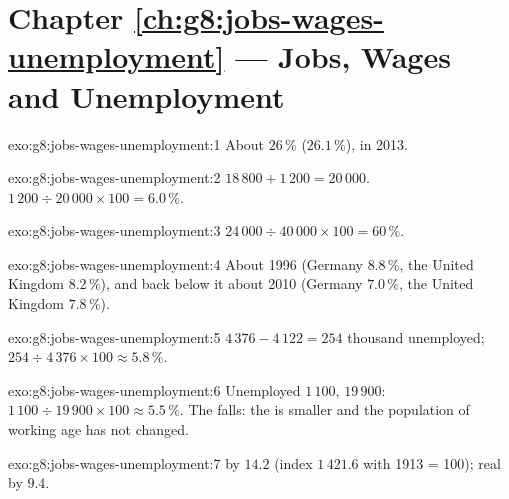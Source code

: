 \section*{Chapter \ref{ch:g8:jobs-wages-unemployment} --- Jobs, Wages and Unemployment}

\begin{solution}{exo:g8:jobs-wages-unemployment:1}
About $26\,\%$ ($26.1\,\%$), in 2013.
\end{solution}

\begin{solution}{exo:g8:jobs-wages-unemployment:2}
 $18\,800 + 1\,200 = 20\,000$.  $1\,200 \div 20\,000 \times 100 = 6.0\,\%$.
\end{solution}

\begin{solution}{exo:g8:jobs-wages-unemployment:3}
$24\,000 \div 40\,000 \times 100 = 60\,\%$.
\end{solution}

\begin{solution}{exo:g8:jobs-wages-unemployment:4}
About 1996 (Germany $8.8\,\%$, the United Kingdom $8.2\,\%$), and back below it about 2010 (Germany
$7.0\,\%$, the United Kingdom $7.8\,\%$).
\end{solution}

\begin{solution}{exo:g8:jobs-wages-unemployment:5}
$4\,376 - 4\,122 = 254$ thousand unemployed; $254 \div 4\,376 \times 100 \approx 5.8\,\%$.
\end{solution}

\begin{solution}{exo:g8:jobs-wages-unemployment:6}
Unemployed $1\,100$,  $19\,900$: $1\,100 \div 19\,900 \times 100 \approx 5.5\,\%$. The
 falls: the  is smaller and the population of working age has not
changed.
\end{solution}

\begin{solution}{exo:g8:jobs-wages-unemployment:7}
 by $14.2$ (index $1\,421.6$ with 1913 = 100); real  by $9.4$.
\end{solution}

